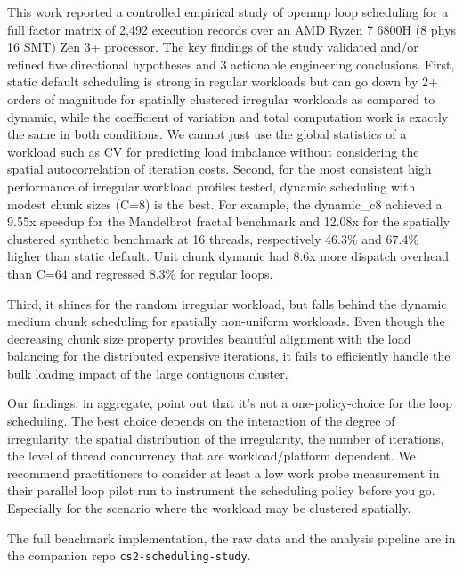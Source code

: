 \documentclass[conference]{IEEEtran}
\begin{document}
This work reported a controlled empirical study of openmp loop scheduling for a full factor matrix of 2,492 execution records over an AMD Ryzen 7 6800H (8 phys 16 SMT) Zen 3+ processor. The key findings of the study validated and/or refined five directional hypotheses and 3 actionable engineering conclusions. First, static default scheduling is strong in regular workloads but can go down by 2+ orders of magnitude for spatially clustered irregular workloads as compared to dynamic, while the coefficient of variation and total computation work is exactly the same in both conditions. We cannot just use the global statistics of a workload such as CV for predicting load imbalance without considering the spatial autocorrelation of iteration costs. Second, for the most consistent high performance of irregular workload profiles tested, dynamic scheduling with modest chunk sizes (C=8) is the best. For example, the dynamic\_c8 achieved a 9.55x speedup for the Mandelbrot fractal benchmark and 12.08x for the spatially clustered synthetic benchmark at 16 threads, respectively 46.3\% and 67.4\% higher than static default. Unit chunk dynamic had 8.6x more dispatch overhead than C=64 and regressed 8.3\% for regular loops.

Third, it shines for the random irregular workload, but falls behind the dynamic medium chunk scheduling for spatially non-uniform workloads. Even though the decreasing chunk size property provides beautiful alignment with the load balancing for the distributed expensive iterations, it fails to efficiently handle the bulk loading impact of the large contiguous cluster.

Our findings, in aggregate, point out that it's not a one-policy-choice for the loop scheduling. The best choice depends on the interaction of the degree of irregularity, the spatial distribution of the irregularity, the number of iterations, the level of thread concurrency that are workload/platform dependent. We recommend practitioners to consider at least a low work probe measurement in their parallel loop pilot run to instrument the scheduling policy before you go. Especially for the scenario where the workload may be clustered spatially.

The full benchmark implementation, the raw data and the analysis pipeline are in the companion repo \texttt{cs2-scheduling-study}.



\end{document}
